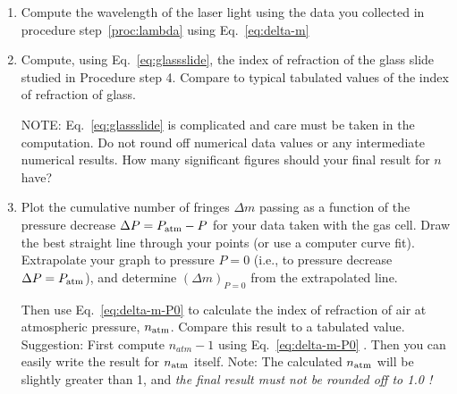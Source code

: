 \begin{enumerate}
\item Compute the wavelength of the laser light using the data you collected in procedure step~\ref{proc:lambda} using Eq.~\ref{eq:delta-m}

\item Compute, using Eq.~\ref{eq:glassslide}, the index of refraction of the glass 
slide studied in Procedure step 4. Compare to typical tabulated 
values of the index of refraction of glass. 

NOTE: Eq.~\ref{eq:glassslide} is complicated and care must be taken in the computation. 
Do not round off numerical data values or any intermediate numerical 
results. How many significant figures should your final result 
for $n$ have?

\item Plot the cumulative number of fringes $\Delta m$ passing 
as a function of the pressure decrease $\Delta P = P_{\rm atm} - 
P$ for your data taken with the gas cell. Draw the best straight 
line through your points (or use a computer curve fit). Extrapolate 
your graph to pressure $P = 0$ (i.e., to pressure decrease $\Delta P 
= P_{\rm atm}$), and determine $(\Delta m)_{P=0}$ from the extrapolated 
line. 

Then use Eq.~\ref{eq:delta-m-P0} to calculate the index of refraction of air 
at atmospheric pressure, $n_{\rm atm}$. Compare this result to a tabulated 
value. Suggestion: First compute $n_{atm} - 1$ using 
Eq.~\ref{eq:delta-m-P0} . Then you can easily write the result for $n_{\rm atm}$ itself. Note: 
The calculated $n_{\rm atm}$ will be slightly greater than 1, and {\em the 
final result must not be rounded off to 1.0 !}



\end{enumerate}


